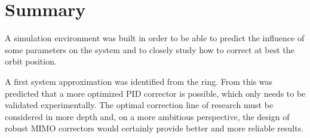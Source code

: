 \section{Summary}
A simulation environment was built in order to be able to predict the influence of some parameters on the system and to closely study how to correct at best the orbit position.

A first system approximation was identified from the ring. From this was predicted that a more optimized PID corrector is possible, which only needs to be validated experimentally. The optimal correction line of research must be considered in more depth and, on a more ambitious perspective, the design of robust MIMO correctors would certainly provide better and more reliable results.
